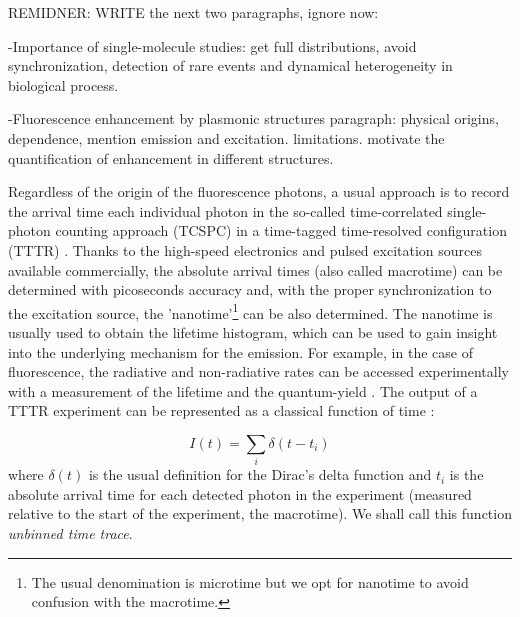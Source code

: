 REMIDNER: WRITE the next two paragraphs, ignore now: %

-Importance of single-molecule studies: get full distributions, avoid synchronization, detection of rare events and dynamical heterogeneity in biological process. 

-Fluorescence enhancement by plasmonic structures paragraph: physical origins, dependence, mention emission and excitation. limitations. motivate the quantification of enhancement in different structures.

Regardless of the origin of the fluorescence photons, a usual approach is to record the arrival time each individual 
photon in the so-called time-correlated single-photon counting approach (TCSPC) in a time-tagged 
time-resolved configuration (TTTR) \cite{Wahl_picoquant}. 
Thanks to the high-speed electronics and pulsed excitation sources available commercially, 
the absolute arrival times (also called macrotime) can be determined with picoseconds accuracy and, with the proper synchronization to the excitation source, the 'nanotime'\footnote{The usual denomination is microtime but we opt for nanotime to avoid confusion with the macrotime.} can be also determined. 
The nanotime is usually used to obtain the lifetime histogram, which can be used to 
gain insight into the underlying mechanism for the emission. For example, 
in the case of fluorescence, the radiative and non-radiative rates can be accessed experimentally with a 
measurement of the lifetime and the quantum-yield \cite{lakowicz2007principles}.
The output of a TTTR experiment can be represented as a classical function of time \cite{Lippitz2005}:

\begin{equation}
I(t) = \sum_i \delta( t-t_i)
\label{eq:intensity_TCSPC}
\end{equation}
where $\delta(t)$ is the usual definition for the Dirac's delta function and $t_i$ is the absolute arrival time
for each detected photon in the experiment (measured relative to the start of the experiment, the macrotime). 
We shall call this function \textit{unbinned time trace}. 
 


